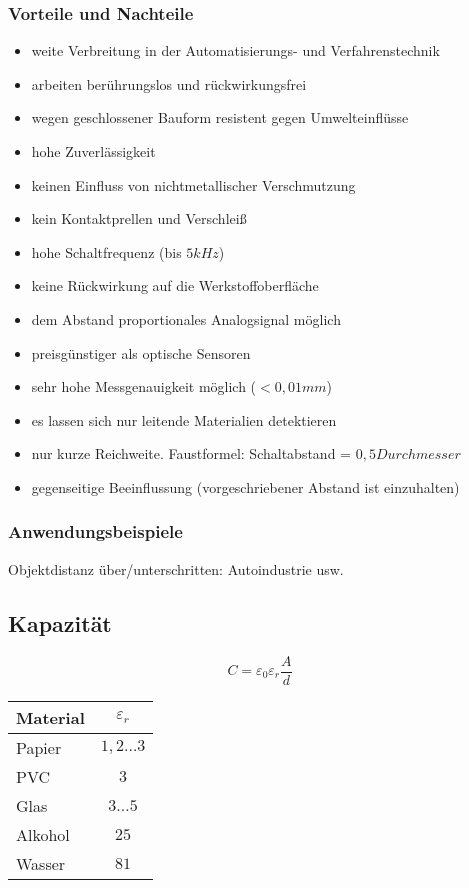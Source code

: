 \documentclass{scrreprt}
\begin{document}
\subsubsection{Vorteile und Nachteile}
\begin{itemize}[label=$+$]
\item weite Verbreitung in der Automatisierungs- und Verfahrenstechnik
\item arbeiten berührungslos und rückwirkungsfrei
\item wegen geschlossener Bauform resistent gegen Umwelteinflüsse
\item hohe Zuverlässigkeit
\item keinen Einfluss von nichtmetallischer Verschmutzung
\item kein Kontaktprellen und Verschleiß
\item hohe Schaltfrequenz (bis $5 \unit{kHz}$)
\item keine Rückwirkung auf die Werkstoffoberfläche
\item dem Abstand proportionales Analogsignal möglich
\item preisgünstiger als optische Sensoren
\item sehr hohe Messgenauigkeit möglich ($< 0,01 \unit{mm}$)
\end{itemize}
\begin{itemize}[label=$-$]
\item es lassen sich nur leitende Materialien detektieren
\item nur kurze Reichweite. Faustformel: Schaltabstand = $0,5 \unit{Durchmesser}$
\item gegenseitige Beeinflussung (vorgeschriebener Abstand ist einzuhalten)
\end{itemize}

\subsubsection{Anwendungsbeispiele}
Objektdistanz über/unterschritten: Autoindustrie usw.

\subsection{Kapazität}
$$C=\varepsilon_0 \varepsilon_r \frac{A}{d}$$
\begin{tabular}{l | c}
Material & $\varepsilon_r$\\\hline
Papier & $1,2\ldots 3$\\
PVC & $3$\\
Glas & $3 \ldots 5$\\
Alkohol & $25$\\
Wasser & $81$
\end{tabular}
\end{document}
